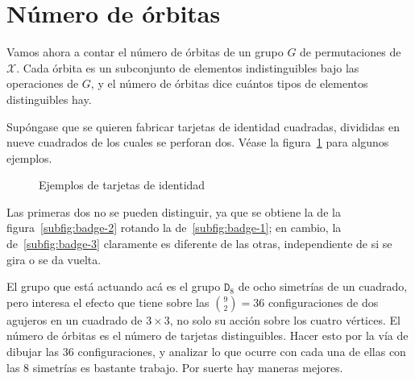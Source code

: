\section{Número de órbitas}
\label{sec:numero-orbitas}

  Vamos ahora a contar el número de órbitas de un grupo \(G\)
  de permutaciones de \(\mathcal{X}\).
  Cada órbita es un subconjunto de elementos indistinguibles
  bajo las operaciones de \(G\),
  y el número de órbitas
  dice cuántos tipos de elementos distinguibles hay.

  Supóngase que se quieren fabricar tarjetas de identidad cuadradas,
  divididas en nueve cuadrados de los cuales se perforan dos.
  Véase la figura~\ref{fig:tarjetas} para algunos ejemplos.
  \begin{figure}[htbp]
    \centering
    \hspace{2em}%
    \hspace{2em}%
    \caption{Ejemplos de tarjetas de identidad}
    \label{fig:tarjetas}
  \end{figure}
  Las primeras dos no se pueden distinguir,
  ya que se obtiene la de la figura~\ref{subfig:badge-2}
  rotando la de~\ref{subfig:badge-1};
  en cambio,
  la de~\ref{subfig:badge-3} claramente es diferente de las otras,
  independiente de si se gira o se da vuelta.

  El grupo que está actuando acá
  es el grupo \(\mathtt{D}_8\) de ocho simetrías de un cuadrado,%
  pero interesa el efecto que tiene
  sobre las \(\binom{9}{2} = 36\) configuraciones de dos agujeros
  en un cuadrado de \(3 \times 3\),
  no solo su acción sobre los cuatro vértices.
  El número de órbitas es el número de tarjetas distinguibles.
  Hacer esto por la vía de dibujar las \(36\) configuraciones,
  y analizar lo que ocurre
  con cada una de ellas con las \(8\) simetrías
  es bastante trabajo.
  Por suerte hay maneras mejores.

